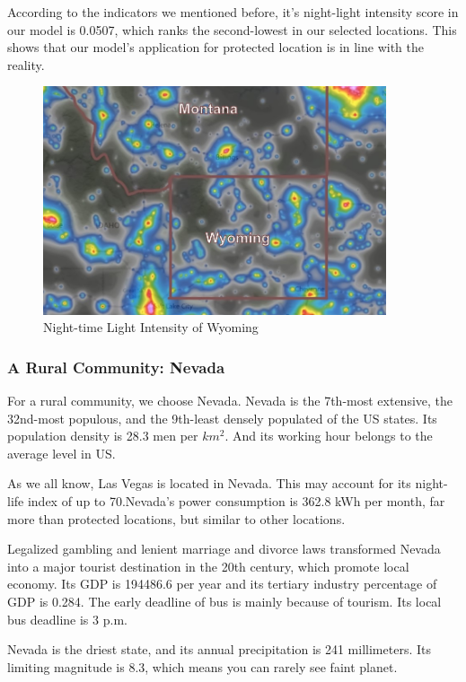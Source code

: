 According to the indicators we mentioned before, it's night-light intensity score in our model is 0.0507, which ranks the second-lowest in our selected locations. This shows that our model's application for protected location  is in line with the reality.
\begin{figure}[H]\centering
    \includegraphics[width=0.9\textwidth]{figures/texted/Wyoming_new.jpg}
    \caption{Night-time Light Intensity of Wyoming} \label{fig:figure3}
\end{figure}


\subsubsection{A Rural Community: Nevada}
For a rural community, we choose Nevada. Nevada is the 7th-most extensive, the 32nd-most populous, and the 9th-least densely populated of the US states. Its population density is 28.3 men per $km^2$. And its working hour belongs to the average level in US.

As we all know, Las Vegas is located in Nevada. This may account for its night-life index of up to 70.Nevada's power consumption is 362.8 kWh per month, far more than protected locations, but similar to other locations.

Legalized gambling and lenient marriage and divorce laws transformed Nevada into a major tourist destination in the 20th century, which promote local economy. Its GDP is 194486.6 per year and its tertiary industry percentage of GDP is 0.284. The early deadline of bus is mainly because of tourism. Its local bus deadline is 3 p.m.

Nevada is the driest state, and its annual precipitation is 241 millimeters. Its limiting magnitude is 8.3, which means you can rarely see faint planet.

